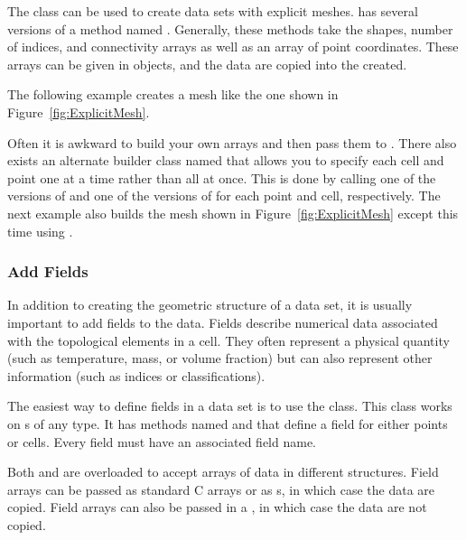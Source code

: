 The  class can be used to create data sets
with explicit meshes.  has several
versions of a method named . Generally, these methods take
the shapes, number of indices, and connectivity arrays as well as an array
of point coordinates. These arrays can be given in 
objects, and the data are copied into the  created.

The following example creates a mesh like the one shown in
Figure~\ref{fig:ExplicitMesh}.


Often it is awkward to build your own arrays and then pass them to
. There also exists an alternate
builder class named  that allows
you to specify each cell and point one at a time rather than all at once.
This is done by calling one of the versions of  and one
of the versions of  for each point and cell,
respectively. The next example also builds the mesh shown in
Figure~\ref{fig:ExplicitMesh} except this time using
.


\subsubsection{Add Fields}

In addition to creating the geometric structure of a data set, it is
usually important to add fields to the data. Fields describe numerical data
associated with the topological elements in a cell. They often represent a
physical quantity (such as temperature, mass, or volume fraction) but can
also represent other information (such as indices or classifications).

The easiest way to define fields in a data set is to use the
 class. This class works on
s of any type. It has methods named
 and  that define a field
for either points or cells. Every field must have an associated field name.

Both  and  are overloaded to
accept arrays of data in different structures. Field arrays can be passed
as standard C arrays or as s, in which case the data
are copied. Field arrays can also be passed in a
, in which case the data are not copied.

